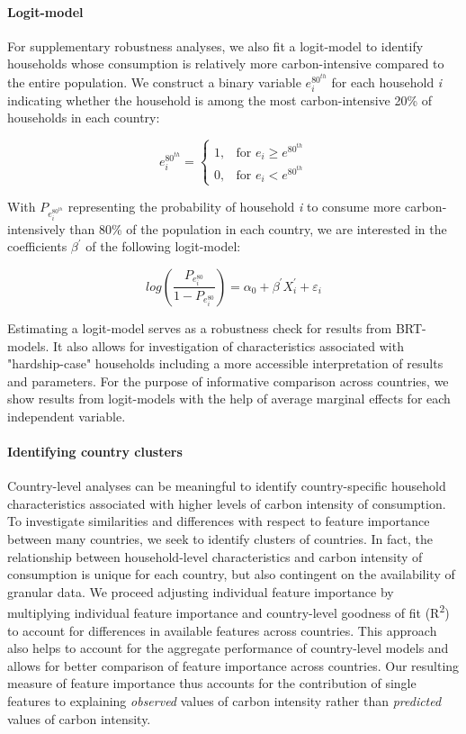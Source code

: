 \documentclass[12pt, a4paper]{article}
\begin{document}
\paragraph{Logit-model} For supplementary robustness analyses, we also fit a logit-model to identify households whose consumption is relatively more carbon-intensive compared to the entire population. We construct a binary variable $e_{i}^{80^{th}}$ for each household \textit{i} indicating whether the household is among the most carbon-intensive 20\% of households in each country:

\begin{equation}\label{eq:logit}
    e_{i}^{80^{th}} =
    \begin{cases}
    1, & \text{for }  e_{i} \geq e^{80^{th}} \\
    0, & \text{for }  e_{i} < e^{80^{th}}
    \end{cases}
\end{equation}

With $P_{e_{i}^{80^{th}}}$ representing the probability of household \textit{i} to consume more carbon-intensively than 80\% of the population in each country, we are interested in the coefficients $\beta^{'}$ of the following logit-model:

\begin{equation} \label{logit}
    log \left( \frac{P_{e_{i}^{80}}}{1 - P_{e_{i}^{80}}} \right) = \alpha_{0} + \beta^{'} X_{i}^{'} + \varepsilon_{i}
\end{equation}

Estimating a logit-model serves as a robustness check for results from BRT-models. It also allows for investigation of characteristics associated with "hardship-case" households including a more accessible interpretation of results and parameters. For the purpose of informative comparison across countries, we show results from logit-models with the help of average marginal effects for each independent variable.

\paragraph{Identifying country clusters} Country-level analyses can be meaningful to identify country-specific household characteristics associated with higher levels of carbon intensity of consumption. To investigate similarities and differences with respect to feature importance between many countries, we seek to identify clusters of countries. In fact, the relationship between household-level characteristics and carbon intensity of consumption is unique for each country, but also contingent on the availability of granular data. We proceed adjusting individual feature importance by multiplying individual feature importance and country-level goodness of fit (R\textsuperscript{2}) to account for differences in available features across countries. This approach also helps to account for the aggregate performance of country-level models and allows for better comparison of feature importance across countries. Our resulting measure of feature importance thus accounts for the contribution of single features to explaining \textit{observed} values of carbon intensity rather than \textit{predicted} values of carbon intensity.
\end{document}
